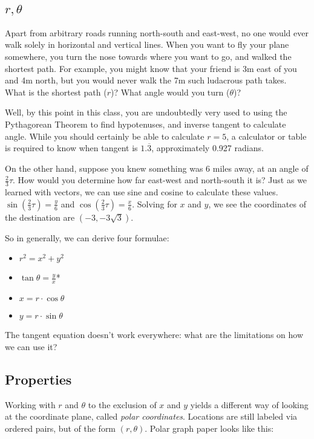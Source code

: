 
\subsection{$r, \theta$}
Apart from arbitrary roads running north-south and east-west, no one would ever walk solely
in horizontal and vertical lines.  When you want to fly your plane somewhere, you turn the
nose towards where you want to go, and walked the shortest path.  For example, you might
know that your friend is 3m east of you and 4m north, but you would never walk the 7m such 
ludacrous path takes.  What is the shortest path ($r$)?  What angle would you turn ($\theta$)?


Well, by this point in this class, you are undoubtedly very used to using the Pythagorean Theorem
to find hypotenuses, and inverse tangent to calculate angle.  While you should certainly be able to
calculate $r=5$, a calculator or table is required to know when tangent is $1.\overline{3}$, 
approximately 0.927 radians.

On the other hand, suppose you knew something was 6 miles away, at an angle of $\frac{2}{3}\tau$.
How would you determine how far east-west and north-south it is?  Just as we learned with vectors,
we can use sine and cosine to calculate these values.  $\sin(\frac{2}{3}\tau)=\frac{y}{6}$ and 
$\cos(\frac{2}{3}\tau)=\frac{x}{6}$.  Solving for $x$ and $y$, we see the coordinates of the
destination are $(-3,-3\sqrt{3})$.

So in generally, we can derive four formulae:
\begin{itemize}
\item $r^2=x^2+y^2$
\item $\tan\theta=\frac{y}{x}$*
\item $x=r\cdot\cos\theta$
\item $y=r\cdot\sin\theta$
\end{itemize}
The tangent equation doesn't work everywhere: what are the limitations on how we can use it?

\subsection{Properties}
Working with $r$ and $\theta$ to the exclusion of $x$ and $y$ yields a different way of looking
at the coordinate plane, called \emph{polar coordinates}.  Locations are still labeled via ordered
pairs, but of the form $(r,\theta)$.  Polar graph paper looks like this:

